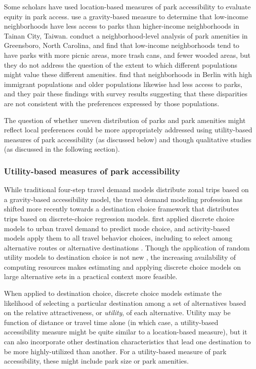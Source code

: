 \documentclass[3p, authoryear]{elsarticle} %
\begin{document}
Some scholars have used location-based measures of park accessibility to
evaluate equity in park access. \citet{chang2011exploring} use a gravity-based measure
to determine that low-income neighborhoods have less access to parks than
higher-income neighborhoods in Tainan City, Taiwan. \citet{bruton2014disparities}
conduct a neighborhood-level analysis of park amenities in Greensboro, North
Carolina, and find that low-income neighborhoods tend to have parks with more
picnic areas, more trash cans, and fewer wooded areas, but they do not address
the question of the extent to which different populations might value these
different amenities. \citet{kabisch2014green} find that neighborhoods in Berlin with
high immigrant populations and older populations likewise had less access to
parks, and they pair these findings with survey results suggesting that these
disparities are not consistent with the preferences expressed by those
populations.

The question of whether uneven distribution of parks and park amenities might
reflect local preferences could be more appropriately addressed using
utility-based measures of park accessibility (as discussed below) and though
qualitative studies (as discussed in the following section).

\hypertarget{utility-based-measures-of-park-accessibility}{%
\subsubsection{Utility-based measures of park accessibility}\label{utility-based-measures-of-park-accessibility}}

While traditional four-step travel demand models distribute zonal trips based on
a gravity-based accessibility model, the travel demand modeling profession has
shifted more recently towards a destination choice framework that distributes
trips based on discrete-choice regression models. \citet{mcfadden1974measurement} first applied
discrete choice models to urban travel demand to predict mode choice, and
activity-based models apply them to all travel behavior choices, including to
select among alternative routes or alternative destinations \citep{de2011modelling}.
Though the application of random utility models to destination choice is not new
\citep[see][]{anas1983discrete}, the increasing availability of computing resources makes
estimating and applying discrete choice models on large alternative sets in a
practical context more feasible.

When applied to destination choice, discrete choice models estimate the
likelihood of selecting a particular destination among a set of alternatives
based on the relative attractiveness, or \emph{utility}, of each alternative. Utility
may be function of distance or travel time alone (in which case, a utility-based
accessibility measure might be quite similar to a location-based measure), but
it can also incorporate other destination characteristics that lead one
destination to be more highly-utilized than another. For a utility-based measure
of park accessibility, these might include park size or park amenities.
\end{document}

